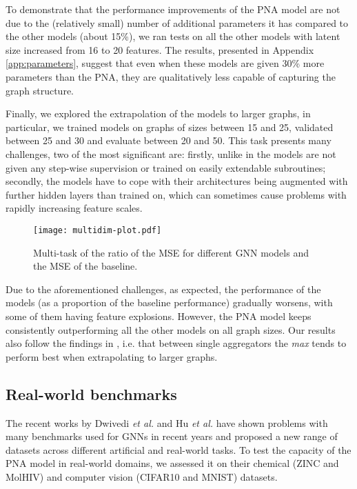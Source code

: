 \documentclass{article}
\begin{document}
To demonstrate that the performance improvements of the PNA model are not due to the (relatively small) number of additional parameters it has compared to the other models (about 15\%), we ran tests on all the other models with latent size increased from 16 to 20 features. The results, presented in Appendix \ref{app:parameters}, suggest that even when these models are given 30\% more parameters than the PNA, they are qualitatively less capable of capturing the graph structure.


Finally, we explored the extrapolation of the models to larger graphs, in particular, we trained models on graphs of sizes between 15 and 25, validated between 25 and 30 and evaluate between 20 and 50. This task presents many challenges, two of the most significant are: firstly, unlike in \cite{velickovic2019neural} the models are not given any step-wise supervision or trained on easily extendable subroutines; secondly, the models have to cope with their architectures being augmented with further hidden layers than trained on, which can sometimes cause problems with rapidly increasing feature scales.


\begin{figure}[h]
\centering
\texttt{[image: multidim-plot.pdf]}
\label{fig:mse_size_plot}
\caption{Multi-task  of the ratio of the MSE for different GNN models and the MSE of the baseline.}
\end{figure} 

Due to the aforementioned challenges, as expected, the performance of the models (as a proportion of the baseline performance) gradually worsens, with some of them having feature explosions. However, the PNA model keeps consistently outperforming all the other models on all graph sizes. Our results also follow the findings in \cite{velickovic2019neural}, i.e. that between single aggregators the \textit{max} tends to perform best when extrapolating to larger graphs. 

\subsection{Real-world benchmarks}

The recent works by Dwivedi \emph{et al.} \cite{dwivedi2020benchmarking} and Hu \emph{et al.} \cite{hu2020open} have shown problems with many benchmarks used for GNNs in recent years and proposed a new range of datasets across different artificial and real-world tasks. To test the capacity of the PNA model in real-world domains, we assessed it on their chemical (ZINC and MolHIV) and computer vision (CIFAR10 and MNIST) datasets.
\end{document}
